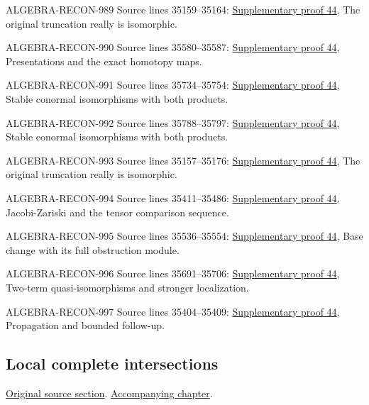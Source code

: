 \begin{AlgebraSourceRoutes}
\item[ALGEBRA-RECON-989] Source lines 35159--35164: \hyperlink{algebra_naive_cotangent_notes_20260928}{Supplementary proof 44}, The original truncation really is isomorphic.
\item[ALGEBRA-RECON-990] Source lines 35580--35587: \hyperlink{algebra_naive_cotangent_notes_20260928}{Supplementary proof 44}, Presentations and the exact homotopy maps.
\item[ALGEBRA-RECON-991] Source lines 35734--35754: \hyperlink{algebra_naive_cotangent_notes_20260928}{Supplementary proof 44}, Stable conormal isomorphisms with both products.
\item[ALGEBRA-RECON-992] Source lines 35788--35797: \hyperlink{algebra_naive_cotangent_notes_20260928}{Supplementary proof 44}, Stable conormal isomorphisms with both products.
\item[ALGEBRA-RECON-993] Source lines 35157--35176: \hyperlink{algebra_naive_cotangent_notes_20260928}{Supplementary proof 44}, The original truncation really is isomorphic.
\item[ALGEBRA-RECON-994] Source lines 35411--35486: \hyperlink{algebra_naive_cotangent_notes_20260928}{Supplementary proof 44}, Jacobi-Zariski and the tensor comparison sequence.
\item[ALGEBRA-RECON-995] Source lines 35536--35554: \hyperlink{algebra_naive_cotangent_notes_20260928}{Supplementary proof 44}, Base change with its full obstruction module.
\item[ALGEBRA-RECON-996] Source lines 35691--35706: \hyperlink{algebra_naive_cotangent_notes_20260928}{Supplementary proof 44}, Two-term quasi-isomorphisms and stronger localization.
\item[ALGEBRA-RECON-997] Source lines 35404--35409: \hyperlink{algebra_naive_cotangent_notes_20260928}{Supplementary proof 44}, Propagation and bounded follow-up.
\end{AlgebraSourceRoutes}

\subsection{Local complete intersections}
\hypertarget{algebra-source-section-lci}{}
\noindent\href{https://github.com/stacks/stacks-project/blob/a04446e57ec1fbc252a871afcec7752fb2807b14/algebra.tex\#L35805}{Original source section}. \href{algebra.pdf\#nameddest=section-lci}{Accompanying chapter}.


